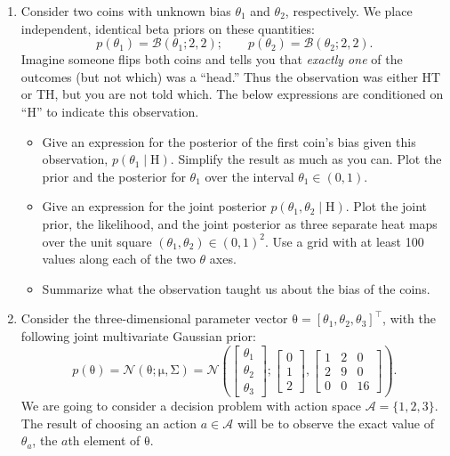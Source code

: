 \documentclass{article}
\newcommand{\given}{\mid}
\newcommand{\mc}[1]{\mathcal{#1}}
\newcommand{\trans}{^\top}
\newcommand{\mat}[1]{\bm{\mathrm{#1}}}
\renewcommand{\vec}[1]{\bm{\mathrm{#1}}}
\begin{document}
\begin{enumerate}
\item
  Consider two coins with unknown bias $\theta_1$ and $\theta_2$,
  respectively.  We place independent, identical beta priors on these
  quantities:
  \begin{equation*}
    p(\theta_1) = \mc{B}(\theta_1; 2, 2);
    \qquad
    p(\theta_2) = \mc{B}(\theta_2; 2, 2).
  \end{equation*}
  Imagine someone flips both coins and tells you that \emph{exactly
    one} of the outcomes (but not which) was a ``head.''  Thus the
  observation was either HT or TH, but you are not told which.  The
  below expressions are conditioned on ``H'' to indicate this
  observation.
  \begin{itemize}
  \item
    Give an expression for the posterior of the first coin's bias
    given this observation, $p(\theta_1 \given \text{H})$.  Simplify
    the result as much as you can.  Plot the prior and the posterior
    for $\theta_1$ over the interval $\theta_1 \in (0, 1)$.
  \item
    Give an expression for the joint posterior $p(\theta_1, \theta_2
    \given \text{H})$. Plot the joint prior, the likelihood, and the
    joint posterior as three separate heat maps over the unit square
    $(\theta_1, \theta_2) \in (0, 1)^2$.  Use a grid with at least 100
    values along each of the two $\theta$ axes.
  \item
    Summarize what the observation taught us about the bias of the
    coins.
  \end{itemize}

\item
  Consider the three-dimensional parameter vector $\vec{\theta} =
  [\theta_1, \theta_2, \theta_3]\trans$, with the following joint
  multivariate Gaussian prior:
  \begin{equation*}
    p(\vec{\theta})
    =
    \mc{N}(\vec{\theta}; \vec{\mu}, \mat{\Sigma})
    =
    \mc{N}
    \left(
    \begin{bmatrix}
      \theta_1 \\
      \theta_2 \\
      \theta_3
    \end{bmatrix}
    ;
    \begin{bmatrix}
      0 \\
      1 \\
      2
    \end{bmatrix},
    \begin{bmatrix}
      1 & 2 & 0   \\
      2 & 9 & 0 \\
      0 & 0 & 16
    \end{bmatrix}
    \right).
  \end{equation*}
  We are going to consider a decision problem with action space
  $\mc{A} = \{1, 2, 3\}$.  The result of choosing an action $a \in
  \mc{A}$ will be to observe the exact value of $\theta_a$, the $a$th
  element of $\vec{\theta}$.


\end{enumerate}
\end{document}

